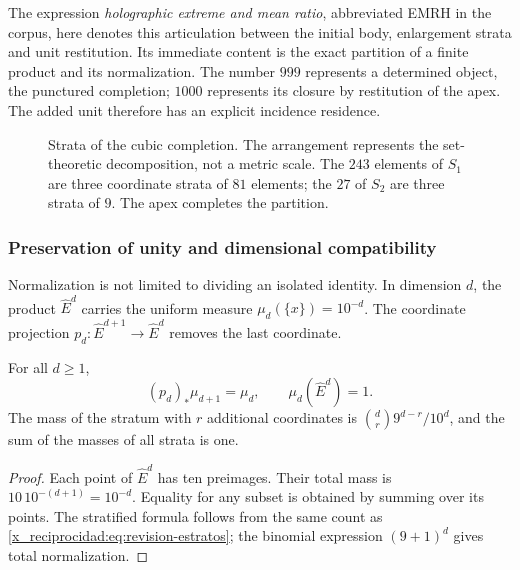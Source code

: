 The expression \emph{holographic extreme and mean ratio}, abbreviated EMRH in
the corpus, here denotes this articulation between the initial body,
enlargement strata and unit restitution. Its immediate content
is the exact partition of a finite product and its normalization. The number
\(999\) represents a determined object, the punctured completion;
\(1000\) represents its closure by restitution of the apex. The added
unit therefore has an explicit incidence residence.

\begin{figure}[htbp]
\centering
{}
\caption{Strata of the cubic completion. The arrangement represents
the set-theoretic decomposition, not a metric scale. The \(243\) elements
of \(S_1\) are three coordinate strata of \(81\) elements; the \(27\)
of \(S_2\) are three strata of \(9\). The apex completes the partition.}
\label{x_reciprocidad:fig:revision-emrh}
\end{figure}

\subsubsection{Preservation of unity and dimensional compatibility}

Normalization is not limited to dividing an isolated identity. In dimension
\(d\), the product \(\widehat E^d\) carries the uniform measure
\(\mu_d(\{x\})=10^{-d}\). The coordinate projection
\(p_d:\widehat E^{d+1}\to\widehat E^d\) removes the last coordinate.

\begin{proposition}
For all \(d\geq1\),
\[
 (p_d)_*\mu_{d+1}=\mu_d,
 \qquad \mu_d(\widehat E^d)=1.
\]
The mass of the stratum with \(r\) additional coordinates is
\(\binom dr9^{d-r}/10^d\), and the sum of the masses of all strata
is one.
\end{proposition}
\begin{proof}
Each point of \(\widehat E^d\) has ten preimages. Their total mass is
\(10\,10^{-(d+1)}=10^{-d}\). Equality for any subset
is obtained by summing over its points. The stratified formula follows
from the same count as \eqref{x_reciprocidad:eq:revision-estratos}; the binomial expression
\((9+1)^d\) gives total normalization.
\end{proof}

